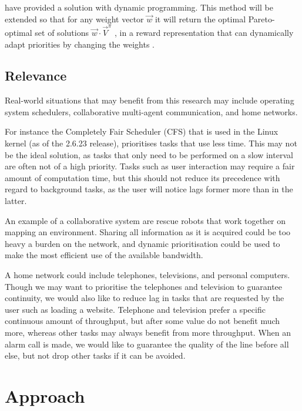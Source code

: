 \documentclass{article}
\begin{document}
\begin{multicols}{2}
	\citet{hansen2004dynamic} have provided a solution with dynamic programming.
	This method will be extended so that for any weight vector $\vec{w}$ it will
	return the optimal Pareto-optimal set of solutions $\vec{w} \cdot
	\vec{V}^\pi$ \citep{vamplew2011empirical}, in a reward representation that
	can dynamically adapt priorities by changing the weights
	\citep{barrett2008learning,natarajan2005dynamic}.

	\subsection{Relevance}
	\label{sub:relevance}
	Real-world situations that may benefit from this research may include
	operating system schedulers, collaborative multi-agent communication, and
	home networks.

	For instance the Completely Fair Scheduler (CFS) that is used in the Linux
	kernel (as of the 2.6.23 release), prioritises tasks that use less time.
	This may not be the ideal solution, as tasks that only need to be performed
	on a slow interval are often not of a high priority. Tasks such as user
	interaction may require a fair amount of computation time, but this should
	not reduce its precedence with regard to background tasks, as the user will
	notice lags former more than in the latter.

	An example of a collaborative system are rescue robots that work together on
	mapping an environment. Sharing all information as it is acquired could be
	too heavy a burden on the network, and dynamic prioritisation could be used
	to make the most efficient use of the available bandwidth.

	A home network could include telephones, televisions, and personal
	computers. Though we may want to prioritise the telephones and television to
	guarantee continuity, we would also like to reduce lag in tasks that are
	requested by the user such as loading a website. Telephone and television
	prefer a specific continuous amount of throughput, but after some value do
	not benefit much more, whereas other tasks may always benefit from more
	throughput. When an alarm call is made, we would like to guarantee the
	quality of the line before all else, but not drop other tasks if it can be
	avoided.

	\section{Approach}
	\label{sec:approach}


\end{multicols}
\end{document}
